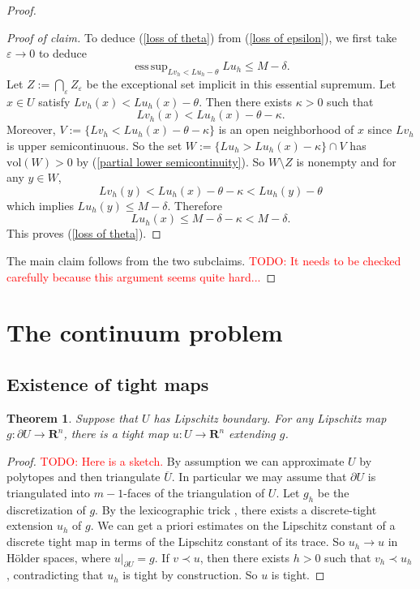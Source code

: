 \documentclass[reqno,11pt]{amsart}
\newcommand{\RR}{\mathbf{R}}
\newcommand{\vol}{\mathrm{vol}}
\DeclareMathOperator*{\esssup}{ess\,sup}
\newtheorem{theorem}{Theorem}[section]
\theoremstyle{definition}
\numberwithin{equation}{section}
\newcommand\todo[1]{\textcolor{red}{TODO: #1}}
\begin{document}
\begin{proof}
\begin{proof}[Proof of claim]
To deduce (\ref{loss of theta}) from (\ref{loss of epsilon}), we first take $\varepsilon \to 0$ to deduce 
$$\esssup_{Lv_h < Lu_h - \theta} Lu_h \leq M - \delta.$$
Let $Z := \bigcap_\varepsilon Z_\varepsilon$ be the exceptional set implicit in this essential supremum.
Let $x \in U$ satisfy $Lv_h(x) < Lu_h(x) - \theta$.
Then there exists $\kappa > 0$ such that
$$Lv_h(x) < Lu_h(x) - \theta - \kappa.$$
Moreover, $V := \{Lv_h < Lu_h(x) - \theta - \kappa\}$ is an open neighborhood of $x$ since $Lv_h$ is upper semicontinuous.
So the set $W := \{Lu_h > Lu_h(x) - \kappa\} \cap V$ has $\vol(W) > 0$ by (\ref{partial lower semicontinuity}).
So $W \setminus Z$ is nonempty and for any $y \in W$,
$$Lv_h(y) < Lu_h(x) - \theta - \kappa < Lu_h(y) - \theta$$
which implies $Lu_h(y) \leq M - \delta$.
Therefore
$$Lu_h(x) \leq M - \delta - \kappa < M - \delta.$$
This proves (\ref{loss of theta}).
\end{proof}

The main claim follows from the two subclaims. \todo{It needs to be checked carefully because this argument seems quite hard...}
\end{proof}

\section{The continuum problem}
\subsection{Existence of tight maps}
\begin{theorem}
Suppose that $U$ has Lipschitz boundary.
For any Lipschitz map $g: \partial U \to \RR^n$, there is a tight map $u: U \to \RR^n$ extending $g$.
\end{theorem}
\begin{proof}
\todo{Here is a sketch.}
By assumption we can approximate $U$ by polytopes and then triangulate $\overline U$.
In particular we may assume that $\partial U$ is triangulated into $m - 1$-faces of the triangulation of $U$.
Let $g_h$ be the discretization of $g$.
By the lexicographic trick \cite[Theorem 1.2]{Sheffield12}, there exists a discrete-tight extension $u_h$ of $g$.
We can get a priori estimates on the Lipschitz constant of a discrete tight map in terms of the Lipschitz constant of its trace.
So $u_h \to u$ in H\"older spaces, where $u|_{\partial U} = g$.
If $v \prec u$, then there exists $h > 0$ such that $v_h \prec u_h$, contradicting that $u_h$ is tight by construction.
So $u$ is tight.
\end{proof}
\end{document}
